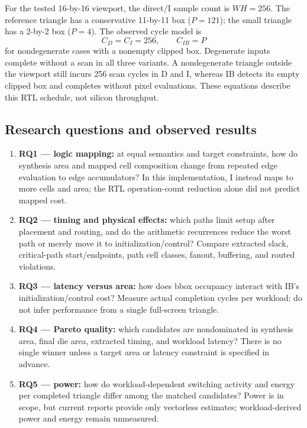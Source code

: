 \documentclass[10pt,a4paper]{article}
\begin{document}
For the tested 16-by-16 viewport, the direct/I sample count is \(WH=256\).
The reference triangle has a conservative 11-by-11 box (\(P=121\)); the
small triangle has a 2-by-2 box (\(P=4\)). The observed cycle model is
\[
C_D=C_I=256,\qquad C_{IB}=P
\]
for nondegenerate cases with a nonempty clipped box. Degenerate inputs
complete without a scan in all three variants. A nondegenerate triangle
outside the viewport still incurs 256 scan cycles in D and I, whereas IB
detects its empty clipped box and completes without pixel evaluations.
These equations describe this RTL schedule, not silicon throughput.

\subsection{Research questions and observed results}

\begin{enumerate}[leftmargin=2em]
  \item \textbf{RQ1 --- logic mapping:} at equal semantics and target
        constraints, how do synthesis area and mapped cell composition
        change from repeated edge evaluation to edge accumulators? In this
        implementation, I instead maps to more cells and area; the RTL
        operation-count reduction alone did not predict mapped cost.
  \item \textbf{RQ2 --- timing and physical effects:} which paths limit
        setup after placement and routing, and do the arithmetic recurrences
        reduce the worst path or merely move it to initialization/control?
        Compare extracted slack, critical-path start/endpoints, path cell
        classes, fanout, buffering, and routed violations.
  \item \textbf{RQ3 --- latency versus area:} how does bbox occupancy
        interact with IB's initialization/control cost? Measure actual
        completion cycles per workload; do not infer performance from a
        single full-screen triangle.
  \item \textbf{RQ4 --- Pareto quality:} which candidates are nondominated
        in synthesis area, final die area, extracted timing, and workload
        latency? There is no single winner unless a target area or latency
        constraint is specified in advance.
  \item \textbf{RQ5 --- power:} how do workload-dependent switching activity
        and energy per completed triangle differ among the matched candidates?
        Power is in scope, but current reports provide only vectorless
        estimates; workload-derived power and energy remain unmeasured.
\end{enumerate}
\end{document}
